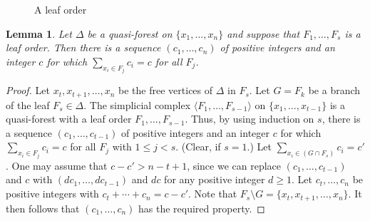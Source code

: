 \documentclass[12pt]{amsart}
\numberwithin{equation}{section}
\newtheorem{lemma}[theorem]{Lemma}
\theoremstyle{definition}
\newcounter{i} %
\begin{document}
\begin{figure}[h]
\centering
{}
\caption{A leaf order} \label{fig:leaf}
\end{figure} 


\begin{lemma}
\label{AAAAA}
Let $\Delta$ be a quasi-forest on $\{x_1, \ldots, x_n\}$ and suppose that $F_1, \ldots, F_s$ is a leaf order.  Then there is a sequence $(c_1, \ldots, c_n)$ of positive integers and an integer $c$ for which $\sum_{x_i \in F_j}c_i = c$ for all $F_j$.    
\end{lemma}

\begin{proof}
Let $x_t, x_{t+1}, \ldots, x_n$ be the free vertices of $\Delta$ in $F_s$. Let $G=F_k$ be a branch of the leaf $F_s \in \Delta$. The simplicial complex $\langle F_1, \ldots, F_{s-1}\rangle$ on $\{x_1, \ldots, x_{t-1}\}$
is a quasi-forest with a leaf order $F_1, \ldots, F_{s-1}$.  Thus, by using induction on $s$, there
is a sequence $(c_1, \ldots, c_{t-1})$ of positive integers and an integer $c$ for which $\sum_{x_i \in F_j}c_i = c$ for all $F_j$ with $1 \leq j < s$.  (Clear, if $s=1$.)  Let $\sum_{x_i \in (G\cap F_{s})}c_i = c'$.  One may assume that $c - c' > n - t + 1$, since we can replace $(c_1,\ldots,c_{t-1})$ and $c$ with
$(dc_1,\ldots,dc_{t-1})$ and $dc$ for any positive
integer $d \geq 1$. Let $c_t, \ldots, c_n$ be positive integers with $c_t + \cdots + c_n = c - c'$. Note that $F_s\setminus G = \{x_t,x_{t+1},\ldots,x_n\}$. It then follows that $(c_1, \ldots, c_n)$ has the required property.
\end{proof}
\end{document}

